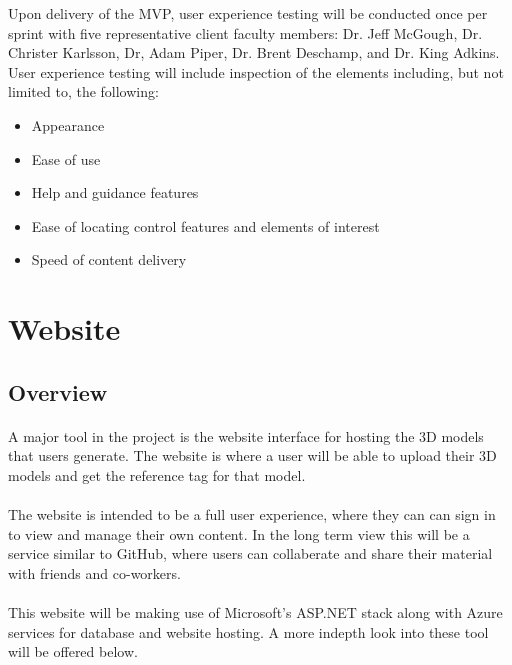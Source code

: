 Upon delivery of the MVP, user experience testing will be conducted once per sprint with five representative client faculty members: Dr. Jeff McGough, Dr. Christer Karlsson, Dr, Adam Piper, Dr. Brent Deschamp, and Dr. King Adkins. User experience testing will include inspection of the elements including, but not limited to, the following:

\begin{itemize}
	\item Appearance
	\item Ease of use
	\item Help and guidance features
	\item Ease of locating control features and elements of interest
	\item Speed of content delivery 
\end{itemize}

 \section{Website}

 \subsection{Overview}
 \paragraph{}
 A major tool in the project is the website interface for hosting the 3D models that users generate.
 The website is where a user will be able to upload their 3D models
 and get the reference tag for that model.
 
 \paragraph{}
 The website is intended to be a full user experience, where they can
 can sign in to view and manage their own content. In the long term view
 this will be a service similar to GitHub, where users can collaberate and share
 their material with friends and co-workers.

\paragraph{}
This website will be making use of Microsoft's ASP.NET stack along with
Azure services for database and website hosting. A more indepth look into 
these tool will be offered below.

